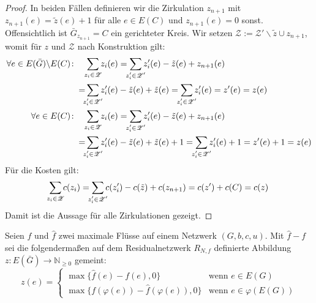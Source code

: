 \begin{proof}
In beiden Fällen definieren wir die Zirkulation $z_{n+1}$ mit $z_{n+1}(e)=\tilde{z}(e)+1$ für alle $e\in E(C)$ und $z_{n+1}(e)=0$ sonst. Offensichtlich ist $\bar{G}_{z_{n+1}}=C$ ein gerichteter Kreis. Wir setzen $\mathscr{Z}:=\mathscr{Z}'\backslash\tilde{z}\cup z_{n+1}$, womit für $z$ und $\mathscr{Z}$ nach Konstruktion gilt:
\begin{align*}
\forall e\in E(\bar{G})\backslash E(C)\colon\quad &\sum_{\mathclap{z_i\in\mathscr{Z}}} z_i(e) = \sum_{\mathclap{z'_i\in\mathscr{Z'}}} z'_i(e) - \tilde{z}(e) + z_{n+1}(e)\\
=&\sum_{\mathclap{z'_i\in\mathscr{Z'}}} z'_i(e) - \tilde{z}(e) + \tilde{z}(e) = \sum_{\mathclap{z'_i\in\mathscr{Z'}}} z'_i(e) = z'(e) =z (e)\\
%
\forall e\in E(C)\colon\quad &\sum_{\mathclap{z_i\in\mathscr{Z}}} z_i(e) = \sum_{\mathclap{z'_i\in\mathscr{Z'}}} z'_i(e) - \tilde{z}(e) + z_{n+1}(e)\\
=&\sum_{\mathclap{z'_i\in\mathscr{Z'}}} z'_i(e) - \tilde{z}(e) + \tilde{z}(e) + 1 = \sum_{\mathclap{z'_i\in\mathscr{Z'}}} z'_i(e) + 1 = z'(e) + 1 = z(e)
\end{align*}
Für die Kosten gilt:
\begin{equation*}
\sum_{\mathclap{z_i\in\mathscr{Z}}} c(z_i) = \sum_{\mathclap{z'_i\in\mathscr{Z'}}} c(z'_i) - c(\tilde{z}) + c(z_{n+1}) = c(z') + c(C) = c(z)
\end{equation*}
Damit ist die Aussage für alle Zirkulationen gezeigt.\end{proof}

\begin{nota}Seien $f$ und $\hat{f}$ zwei maximale Flüsse auf einem Netzwerk $(G,b,c,u)$. Mit $\hat{f}-f$ sei die folgendermaßen auf dem Residualnetzwerk $R_{N,f}$ definierte Abbildung $z\colon E(\bar{G})\rightarrow\mathbb{N}_{\geq0}$ gemeint:
\begin{equation*}z(e)=\begin{cases}
\max\{\hat{f}(e)-f(e),0\}&\text{wenn } e\in E(G)\\
\max\{f(\varphi(e))-\hat{f}(\varphi(e)),0\}&\text{wenn } e\in \varphi(E(G))\end{cases}
\end{equation*}\end{nota}

